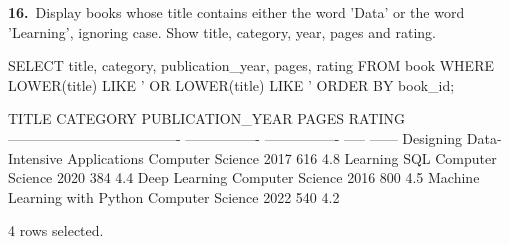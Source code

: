 \noindent\begin{minipage}{\linewidth}
\begingroup{}
{\fontsize{14}{17}\selectfont\textbf{16.}}\ Display books whose title contains either the word 'Data' or the word 'Learning', ignoring case. Show title, category, year, pages and rating.\par
\endgroup\vspace{12pt}


\begin{sqlcode}
SELECT title, category, publication_year, pages, rating
FROM book
WHERE LOWER(title) LIKE '%
   OR LOWER(title) LIKE '%
ORDER BY book_id;
\end{sqlcode}

\vspace{18pt}


\begin{sqlout}[fontsize=\footnotesize]
TITLE                                  CATEGORY          PUBLICATION_YEAR  PAGES  RATING
-------------------------------------  ----------------  ----------------  -----  ------
Designing Data-Intensive Applications  Computer Science              2017    616     4.8
Learning SQL                           Computer Science              2020    384     4.4
Deep Learning                          Computer Science              2016    800     4.5
Machine Learning with Python           Computer Science              2022    540     4.2

4 rows selected.
\end{sqlout}
\end{minipage}\par\vspace{24pt}

